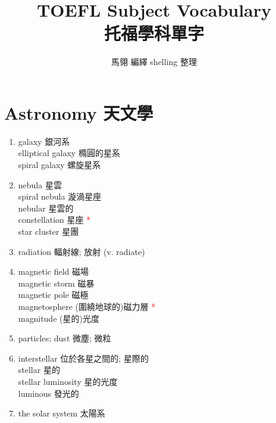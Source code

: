 \documentclass[twoside,b5paper]{book}
\begin{document}
  \title{TOEFL Subject Vocabulary\\ 托福學科單字}
  \author{馬翎 編繹 shelling 整理}
  \maketitle

  \tableofcontents %

  \chapter{Astronomy \kai 天文學}
  \begin{enumerate}
    \item
      galaxy  銀河系\\
      elliptical galaxy 橢圓的星系\\
      spiral galaxy 螺旋星系
    \item
      nebula  星雲\\
      spiral nebula 漩渦星座\\
      nebular 星雲的\\
      constellation  星座 \textcolor{red}{*}\\
      star cluster 星團
    \item
      radiation 輻射線; 放射 (v. radiate)
    \item
      magnetic field 磁場\\
      magnetic storm 磁暴\\
      magnetic pole 磁極\\
      magnetosphere (圍繞地球的)磁力層 \textcolor{red}{*}\\
      magnitude (星的)光度
    \item
      particles; dust 微塵; 微粒
    \item
      interstellar  位於各星之間的; 星際的\\
      stellar  星的\\
      stellar luminosity  星的光度\\
      luminous  發光的
    \item
      the solar system 太陽系\\

\end{enumerate}
\end{document}
